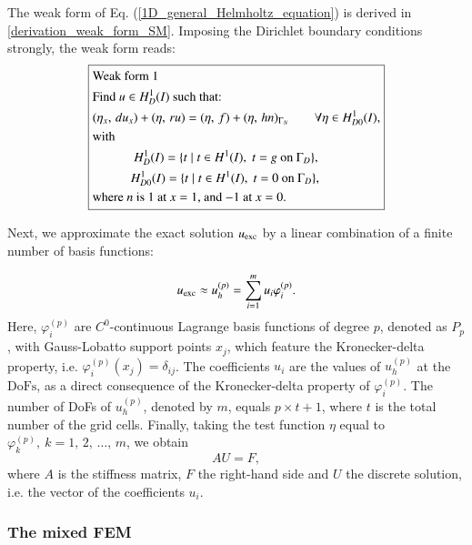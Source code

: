 \documentclass[review,3p]{elsarticle}
\begin{document}
The weak form of Eq. (\ref{1D_general_Helmholtz_equation}) is derived in \ref{derivation_weak_form_SM}. Imposing the Dirichlet boundary conditions strongly, the weak form reads:
\begin{equation}
\centering
\boxed{ 
\begin{aligned}
&\text{Weak~form}~ 1 ~~~~~~~~~\\
&\text{Find $u \in H _D^1 (I)$ such that:} \\
&({ \eta} _{ x }, \, du _{ x }  ) + (\eta, \, ru) = (\eta, \, f ) + (\eta, \, hn)_{\Gamma _N} \qquad \forall \eta \in H _{D0}^1 (I),\\
&\text{with} \\
&~~~~~~~~~~~~~H_{D} ^1 (I) = \{t \; | \; t \in H^1 (I), \; t = g \text{ on } \Gamma _D \},  \\
&~~~~~~~~~~~~H_{D0} ^1 (I) = \{t \; | \; t \in H^1 (I), \; t = 0 \text{ on } \Gamma _D\},\\
&\text{where } {n} \text{ is 1 at $x=1$, and $-1$ at $x=0$.}
\end{aligned}		\label{1D_general_SM_weak_form_Diri_strong} 
}
\end{equation}

Next, we approximate the exact solution $u_{\rm exc}$ by a linear combination of a finite number of basis functions:

\begin{equation}
 u_{\rm exc} \approx u_h^{(p)} = \sum _ {i=1} ^{m} u _{i} \varphi _{i}^{(p)}. \label{General_SM_u_approx}%
\end{equation}
Here, $\varphi _{i}^{(p)}$ are $C^0$-continuous Lagrange basis functions of degree $p$, denoted as $P_p$, with Gauss-Lobatto support points $x_j$, which feature the Kronecker-delta property, i.e. $\varphi _{i}^{(p)} (x_j)=\delta_{ij}$. The coefficients $u_i$ are the values of $u_h^{(p)}$ at the $\text{DoFs}$, as a direct consequence of the Kronecker-delta property of $\varphi _{i}^{(p)}$. The number of DoFs of $u_h^{(p)}$, denoted by $m$, equals $p \times t + 1$, where $t$ is the total number of the grid cells. 
Finally, taking the test function $\eta$ equal to $\varphi ^{(p)}_{k},~ k=1, \,2, \, \ldots , \, m$, we obtain
\begin{equation}
 A {U} = F,				\label{matrix equation std FEM}
\end{equation}
where $A$ is the stiffness matrix, $F$ the right-hand side and $U$ the discrete solution, i.e. the vector of the coefficients $u_i$.

\subsubsection{The mixed FEM}
\end{document}
